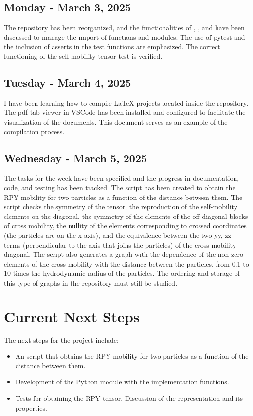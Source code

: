 \documentclass[12pt]{article} %
\begin{document}
\subsection{Monday - March 3, 2025}
The repository has been reorganized, and the functionalities of , ,
and  have been discussed to manage the import of functions and modules. 
The use of pytest and the inclusion of asserts in the test functions are emphasized. 
The correct functioning of the self-mobility tensor test is verified.

\subsection{Tuesday - March 4, 2025}
I have been learning how to compile LaTeX projects located inside the repository.
The pdf tab viewer in VSCode has been installed and configured to facilitate the 
visualization of the documents. This document serves as an example of the compilation 
process.

\subsection{Wednesday - March 5, 2025}
The tasks for the week have been specified and the progress in documentation, code, and testing has been tracked.
The script  has been created to obtain 
the RPY mobility for two particles as a function of the distance 
between them. The script checks the symmetry of the tensor, the 
reproduction of the self-mobility elements on the diagonal, the 
symmetry of the elements of the off-diagonal blocks of cross mobility,
the nullity of the elements corresponding to crossed coordinates 
(the particles are on the x-axis), and the equivalence between the 
two yy, zz terms (perpendicular to the axis that joins the particles) 
of the cross mobility diagonal. The script also generates a graph
with the dependence of the non-zero elements of the cross mobility
with the distance between the particles, from 0.1 to 10 times the
hydrodynamic radius of the particles. The ordering and storage of
this type of graphs in the repository must still be studied.

\section{Current Next Steps}
The next steps for the project include:
\begin{itemize}
    \item An script that obtains the RPY mobility for two particles as a function of the distance between them.
    \item Development of the Python module with the implementation functions.
    \item Tests for obtaining the RPY tensor. Discussion of the representation and its properties.
\end{itemize}
\end{document}
